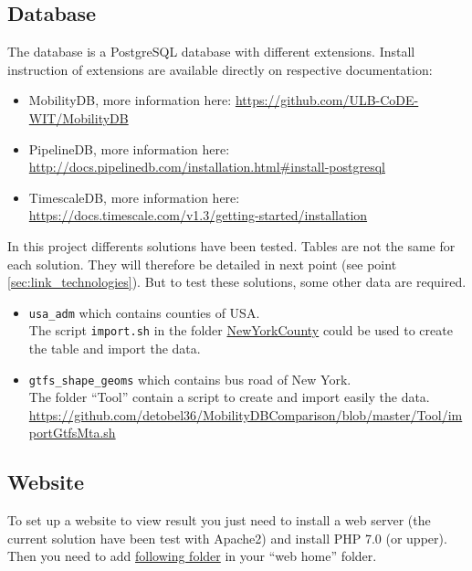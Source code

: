 \documentclass[a4paper,12pt]{article}
\begin{document}
    \subsection{Database}
        The database is a PostgreSQL database with different extensions. Install instruction of extensions are available directly on respective documentation:
        \begin{itemize}
            \item MobilityDB, more information here: \url{https://github.com/ULB-CoDE-WIT/MobilityDB}
            \item PipelineDB, more information here: \url{http://docs.pipelinedb.com/installation.html#install-postgresql}
            \item TimescaleDB, more information here: \url{https://docs.timescale.com/v1.3/getting-started/installation}
        \end{itemize}
        In this project differents solutions have been tested. Tables are not the same for each solution. They will therefore be detailed in next point (see point \ref{sec:link_technologies}). But to test these solutions, some other data are required.
        \begin{itemize}
            \item \verb|usa_adm| which contains counties of USA.\\
            The script \verb|import.sh| in the folder \href{https://github.com/detobel36/MobilityDBComparison/tree/master/Tool/NewYorkCounty}{NewYorkCounty} could be used to create the table and import the data.
            \item \verb|gtfs_shape_geoms| which contains bus road of New York.\\
            The folder ``Tool'' contain a script to create and import easily the data. \url{https://github.com/detobel36/MobilityDBComparison/blob/master/Tool/importGtfsMta.sh}
        \end{itemize}
        
        
    \subsection{Website}
        To set up a website to view result you just need to install a web server (the current solution have been test with Apache2) and install PHP 7.0 (or upper).\\
        
        Then you need to add \href{https://github.com/detobel36/MobilityDBComparison/tree/master/Website}{following folder} in your ``web home'' folder.\\
        
\end{document}
